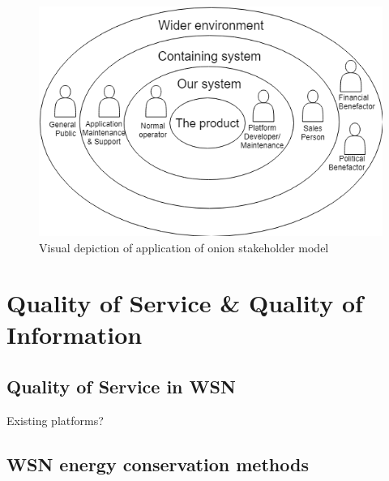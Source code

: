 \begin{figure}
\centering
\includegraphics[width=.7\textwidth]{resources/img/onion.png}
\caption{Visual depiction of application of onion stakeholder model}
\label{fig:onion}
\end{figure}
\section{Quality of Service \& Quality of Information}
\subsection{Quality of Service in WSN} 
Existing platforms?
\subsection{WSN energy conservation methods} 
